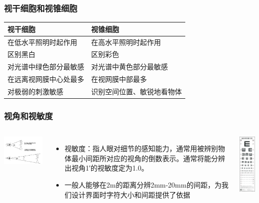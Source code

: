 \documentclass{beamer}
\begin{document}
\begin{frame}
	\frametitle{视干细胞和视锥细胞}
	\beamertemplatetransparentcovereddynamicmedium
	\begin{tabular}[t]{p{4.5cm}|p{4.5cm}}
		\hline
		视干细胞 & 视锥细胞\\\hline
		在低水平照明时起作用 & 在高水平照明时起作用\\\hline
		区别黑白 & 区别彩色\\	\hline
		对光谱中绿色部分最敏感 & 对光谱中黄色部分最敏感\\\hline
		在远离视网膜中心处最多 & 在视网膜中部最多\\\hline
		对极弱的刺激敏感 & 识别空间位置、敏锐地看物体\\\hline
	\end{tabular}
\end{frame}

\begin{frame}
	\frametitle{视角和视敏度}
	\beamertemplatetransparentcovereddynamicmedium
	\begin{columns}
		\column{7.5cm}
		\begin{center}
			\includegraphics[width=5cm]{images/viewport.png}
		\end{center}
		\begin{itemize}[<+->]
			\item 视敏度：{\tiny 指人眼对细节的感知能力，通常用被辨别物体最小间距所对应的视角的倒数表示。通常将能分辨出视角1′的视敏度定为1.0。}
			\item 一般人能够在2m的距离分辨2mm-20mm的间距，为我们设计界面时字符大小和间距提供了依据
		\end{itemize}
	\column{2.5cm}
	\includegraphics[width=2cm]{images/eye-chart.jpg}
	\end{columns}
\end{frame}
\end{document}
